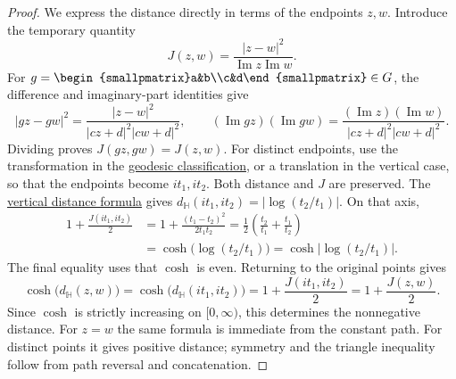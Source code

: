 \begin{proof}
We express the distance directly in terms of the endpoints $z,w$. Introduce the temporary quantity
\[
 J(z,w)=\frac{|z-w|^2}{\operatorname{Im}z\operatorname{Im}w}.
\]
For $g=\begin{smallpmatrix}a&b\\c&d\end{smallpmatrix}\in G$, the difference and imaginary-part identities give
\[
 |gz-gw|^2=\frac{|z-w|^2}{|cz+d|^2|cw+d|^2},\qquad
 (\operatorname{Im}gz)(\operatorname{Im}gw)
 =\frac{(\operatorname{Im}z)(\operatorname{Im}w)}{|cz+d|^2|cw+d|^2}.
\]
Dividing proves $J(gz,gw)=J(z,w)$. For distinct endpoints, use the transformation in the \hyperref[hyperbolic.geodesics]{geodesic classification}, or a translation in the vertical case, so that the endpoints become $it_1,it_2$. Both distance and $J$ are preserved. The \hyperref[hyperbolic.vertical-geodesics]{vertical distance formula} gives $d_{\mathbb H}(it_1,it_2)=|\log(t_2/t_1)|$. On that axis,
\[
 \begin{aligned}
 1+\frac{J(it_1,it_2)}2
 &=1+\frac{(t_1-t_2)^2}{2t_1t_2}
 =\frac12\left(\frac{t_2}{t_1}+\frac{t_1}{t_2}\right)\\
 &=\cosh\bigl(\log(t_2/t_1)\bigr)
 =\cosh|\log(t_2/t_1)|.
 \end{aligned}
\]
The final equality uses that $\cosh$ is even. Returning to the original points gives
\[
 \cosh\bigl(d_{\mathbb H}(z,w)\bigr)
 =\cosh\bigl(d_{\mathbb H}(it_1,it_2)\bigr)
 =1+\frac{J(it_1,it_2)}2
 =1+\frac{J(z,w)}2.
\]
Since $\cosh$ is strictly increasing on $[0,\infty)$, this determines the nonnegative distance. For $z=w$ the same formula is immediate from the constant path. For distinct points it gives positive distance; symmetry and the triangle inequality follow from path reversal and concatenation.
\end{proof}


